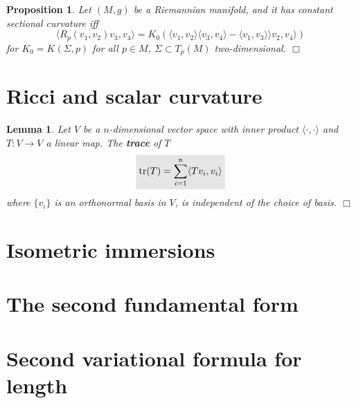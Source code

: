 \documentclass[letter-paper]{tufte-book}
\newtheorem{lemma}[theorem]{\color{pastel-blue}Lemma}
\newtheorem{proposition}[theorem]{\color{pastel-blue}Proposition}
\newcommand{\qedwhite}{\hfill \ensuremath{\Box}}
\newcommand{\highlight}[1]{\mathchoice%
  {\colorbox{black!10}{$\displaystyle#1$}}%
  {\colorbox{black!10}{$\textstyle#1$}}%
  {\colorbox{black!10}{$\scriptstyle#1$}}%
  {\colorbox{black!10}{$\scriptscriptstyle#1$}}}%
\begin{document}
\begin{proposition}
  Let $(M,g)$ be a Riemannian manifold, and it has constant sectional curvature iff
  \begin{equation}
    \langle R_p(v_1, v_2)v_3, v_4\rangle = K_0(\langle v_1, v_2\rangle \langle v_3, v_4\rangle - \langle v_1, v_3 \rangle \rangle v_2, v_4\rangle)
  \end{equation}
  for $K_0 = K(\Sigma, p)$ for all $p\in M$, $\Sigma \subset T_p(M)$ two-dimensional. \qedwhite
\end{proposition}


\section{Ricci and scalar curvature}

\begin{lemma}
  Let $V$ be a $n$-dimensional vector space with inner product $\langle\cdot,\cdot\rangle$ and $T: V\to V$ a linear map. The \textbf{trace} of $T$
  \begin{equation}
    \highlight{\mbox{tr}(T) = \sum_{i=1}^n \langle T v_i, v_i\rangle}
  \end{equation}
  where $\{v_i\}$ is an orthonormal basis in $V$, is independent of the choice of basis. \qedwhite
\end{lemma}


\section{Isometric immersions}


\section{The second fundamental form}


\section{Second variational formula for length}
\end{document}
